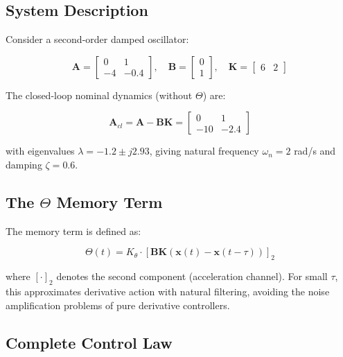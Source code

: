 \documentclass[12pt,a4paper]{article}
\begin{document}
\subsection{System Description}

Consider a second-order damped oscillator:

\begin{equation}
\mathbf{A} = \begin{bmatrix} 0 & 1 \\ -4 & -0.4 \end{bmatrix}, \quad
\mathbf{B} = \begin{bmatrix} 0 \\ 1 \end{bmatrix}, \quad
\mathbf{K} = \begin{bmatrix} 6 & 2 \end{bmatrix}
\label{eq:system}
\end{equation}

The closed-loop nominal dynamics (without $\Theta$) are:

\begin{equation}
\mathbf{A}_{cl} = \mathbf{A} - \mathbf{BK} = \begin{bmatrix} 0 & 1 \\ -10 & -2.4 \end{bmatrix}
\label{eq:acl}
\end{equation}

with eigenvalues $\lambda = -1.2 \pm j2.93$, giving natural frequency 
$\omega_n = 2$ rad/s and damping $\zeta = 0.6$.

\subsection{The $\Theta$ Memory Term}

The memory term is defined as:

\begin{equation}
\Theta(t) = K_\theta \cdot \left[\mathbf{BK}(\mathbf{x}(t) - \mathbf{x}(t-\tau))\right]_2
\label{eq:theta_def}
\end{equation}

where $[\cdot]_2$ denotes the second component (acceleration channel). 
For small $\tau$, this approximates derivative action with natural 
filtering, avoiding the noise amplification problems of pure 
derivative controllers.

\subsection{Complete Control Law}
\end{document}
